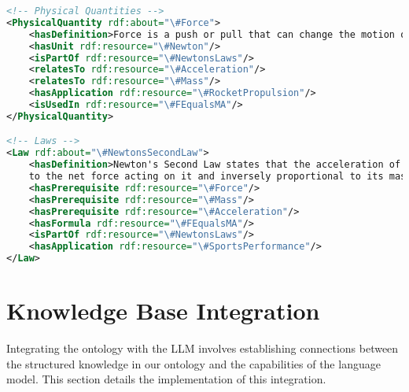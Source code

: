 \begin{lstlisting}[language=XML, caption=Physics Concept Instances, label=lst:ontology-instances]
<!-- Physical Quantities -->
<PhysicalQuantity rdf:about="\#Force">
    <hasDefinition>Force is a push or pull that can change the motion of an object</hasDefinition>
    <hasUnit rdf:resource="\#Newton"/>
    <isPartOf rdf:resource="\#NewtonsLaws"/>
    <relatesTo rdf:resource="\#Acceleration"/>
    <relatesTo rdf:resource="\#Mass"/>
    <hasApplication rdf:resource="\#RocketPropulsion"/>
    <isUsedIn rdf:resource="\#FEqualsMA"/>
</PhysicalQuantity>

<!-- Laws -->
<Law rdf:about="\#NewtonsSecondLaw">
    <hasDefinition>Newton's Second Law states that the acceleration of an object is directly proportional 
    to the net force acting on it and inversely proportional to its mass</hasDefinition>
    <hasPrerequisite rdf:resource="\#Force"/>
    <hasPrerequisite rdf:resource="\#Mass"/>
    <hasPrerequisite rdf:resource="\#Acceleration"/>
    <hasFormula rdf:resource="\#FEqualsMA"/>
    <isPartOf rdf:resource="\#NewtonsLaws"/>
    <hasApplication rdf:resource="\#SportsPerformance"/>
</Law>
\end{lstlisting}

\section{Knowledge Base Integration}
\label{sec:kb-integration}

Integrating the ontology with the LLM involves establishing connections between the structured knowledge in our ontology and the capabilities of the language model. This section details the implementation of this integration.

